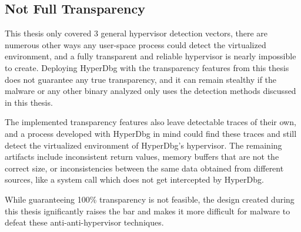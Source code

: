 \subsection{Not Full Transparency}
This thesis only covered 3 general hypervisor detection vectors, there are numerous other ways any user-space process could detect the virtualized environment, 
and a fully transparent and reliable hypervisor is nearly impossible to create. Deploying HyperDbg with the transparency features from this thesis does not guarantee any true 
transparency, and it can remain stealthy if the malware or any other binary analyzed only uses the detection methods discussed in this thesis.

The implemented transparency features also leave detectable traces of their own, and a process developed with HyperDbg in mind could find these 
traces and still detect the virtualized environment of HyperDbg's hypervisor. The remaining artifacts include inconsistent return values, memory buffers 
that are not the correct size, or inconsistencies between the same data obtained from different sources, like a system call which does not get intercepted by HyperDbg.

While guaranteeing 100\% transparency is not feasible, the design created during this thesis ignificantly raises the bar and makes it more difficult for malware to defeat these anti-anti-hypervisor techniques.



